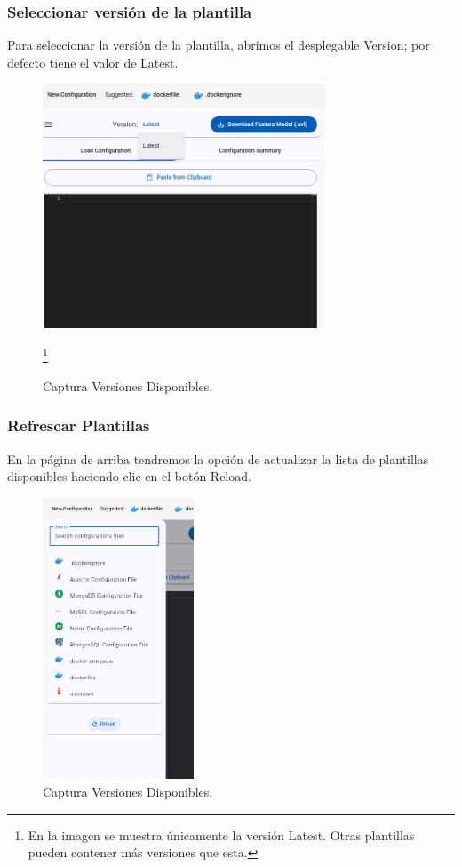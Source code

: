 \documentclass[12pt, a4paper, twoside]{article}
\begin{document}
\begin{umaappendices}
	\subsubsection{Seleccionar versión de la plantilla}
	Para seleccionar la versión de la plantilla, abrimos el desplegable Version; por defecto tiene el valor de Latest.
	\begin{figure}[h]
		\centering
			\includegraphics[width=0.75\textwidth]{selectionVersion.png}
		\caption{Captura Versiones Disponibles.}\footnote{En la imagen se muestra únicamente la versión Latest. Otras plantillas pueden contener más versiones que esta.}
	\end{figure}

	\newpage

	\subsubsection{Refrescar Plantillas}
	\label{sec:Actualizar Plantillas}
	En la página de arriba tendremos la opción de actualizar la lista de plantillas disponibles haciendo clic en el botón Reload.

	\begin{figure}[h]
		\centering
			\includegraphics[width=0.4\textwidth]{RefreshTemplates.png}
		\caption{Captura Versiones Disponibles.}
	\end{figure}


\end{umaappendices}
\end{document}
